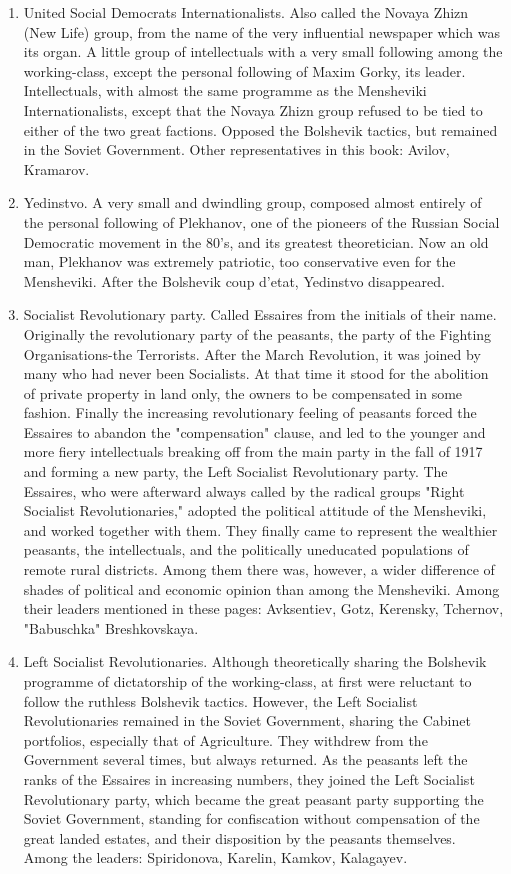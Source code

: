 \begin{enumerate}
\begin{enumerate}
\item United Social Democrats Internationalists. Also called the Novaya Zhizn (New Life) group, from the name of the very influential newspaper which was its organ. A little group of intellectuals with a very small following among the working-class, except the personal following of Maxim Gorky, its leader. Intellectuals, with almost the same programme as the Mensheviki Internationalists, except that the Novaya Zhizn group refused to be tied to either of the two great factions. Opposed the Bolshevik tactics, but remained in the Soviet Government. Other representatives in this book: Avilov, Kramarov.

\item Yedinstvo. A very small and dwindling group, composed almost entirely of the personal following of Plekhanov, one of the pioneers of the Russian Social Democratic movement in the 80's, and its greatest theoretician. Now an old man, Plekhanov was extremely patriotic, too conservative even for the Mensheviki. After the Bolshevik coup d'etat, Yedinstvo disappeared.

\item Socialist Revolutionary party. Called Essaires from the initials of their name. Originally the revolutionary party of the peasants, the party of the Fighting Organisations-the Terrorists. After the March Revolution, it was joined by many who had never been Socialists. At that time it stood for the abolition of private property in land only, the owners to be compensated in some fashion. Finally the increasing revolutionary feeling of peasants forced the Essaires to abandon the "compensation" clause, and led to the younger and more fiery intellectuals breaking off from the main party in the fall of 1917 and forming a new party, the Left Socialist Revolutionary party. The Essaires, who were afterward always called by the radical groups "Right Socialist Revolutionaries," adopted the political attitude of the Mensheviki, and worked together with them. They finally came to represent the wealthier peasants, the intellectuals, and the politically uneducated populations of remote rural districts. Among them there was, however, a wider difference of shades of political and economic opinion than among the Mensheviki. Among their leaders mentioned in these pages: Avksentiev, Gotz, Kerensky, Tchernov, "Babuschka" Breshkovskaya.

\item Left Socialist Revolutionaries. Although theoretically sharing the Bolshevik programme of dictatorship of the working-class, at first were reluctant to follow the ruthless Bolshevik tactics. However, the Left Socialist Revolutionaries remained in the Soviet Government, sharing the Cabinet portfolios, especially that of Agriculture. They withdrew from the Government several times, but always returned. As the peasants left the ranks of the Essaires in increasing numbers, they joined the Left Socialist Revolutionary party, which became the great peasant party supporting the Soviet Government, standing for confiscation without compensation of the great landed estates, and their disposition by the peasants themselves. Among the leaders: Spiridonova, Karelin, Kamkov, Kalagayev.


\end{enumerate}
\end{enumerate}
